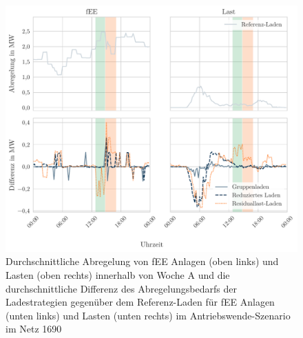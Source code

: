 \begin{figure}[H]
    \centering
    \includegraphics[width=\textwidth]{Bilder/1690_fEE_load_diff}
    \caption{Durchschnittliche Abregelung von fEE Anlagen (oben links) und Lasten (oben rechts) innerhalb von Woche A und die durchschnittliche Differenz des Abregelungsbedarfs der Ladestrategien gegenüber dem Referenz-Laden für fEE Anlagen (unten links) und Lasten (unten rechts) im Antriebswende-Szenario im Netz \num{1690}}\label{fig:1690_fEE_load_diff}
\end{figure}